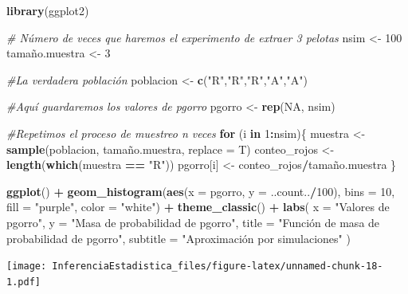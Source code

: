\documentclass[
]{book}
\newenvironment{Shaded}{\begin{snugshade}}{\end{snugshade}}
\newcommand{\CommentTok}[1]{\textcolor[rgb]{0.56,0.35,0.01}{\textit{#1}}}
\newcommand{\ControlFlowTok}[1]{\textcolor[rgb]{0.13,0.29,0.53}{\textbf{#1}}}
\newcommand{\DataTypeTok}[1]{\textcolor[rgb]{0.13,0.29,0.53}{#1}}
\newcommand{\DecValTok}[1]{\textcolor[rgb]{0.00,0.00,0.81}{#1}}
\newcommand{\KeywordTok}[1]{\textcolor[rgb]{0.13,0.29,0.53}{\textbf{#1}}}
\newcommand{\NormalTok}[1]{#1}
\newcommand{\OperatorTok}[1]{\textcolor[rgb]{0.81,0.36,0.00}{\textbf{#1}}}
\newcommand{\OtherTok}[1]{\textcolor[rgb]{0.56,0.35,0.01}{#1}}
\newcommand{\StringTok}[1]{\textcolor[rgb]{0.31,0.60,0.02}{#1}}
\begin{document}
\begin{Shaded}
\begin{Highlighting}[]
\KeywordTok{library}\NormalTok{(ggplot2)}

\CommentTok{# Número de veces que haremos el experimento de extraer 3 pelotas}
\NormalTok{nsim           <-}\StringTok{ }\DecValTok{100}
\NormalTok{tamaño.muestra <-}\StringTok{ }\DecValTok{3}

\CommentTok{#La verdadera población}
\NormalTok{poblacion <-}\StringTok{ }\KeywordTok{c}\NormalTok{(}\StringTok{"R"}\NormalTok{,}\StringTok{"R"}\NormalTok{,}\StringTok{"R"}\NormalTok{,}\StringTok{"A"}\NormalTok{,}\StringTok{"A"}\NormalTok{)}

\CommentTok{#Aquí guardaremos los valores de pgorro}
\NormalTok{pgorro    <-}\StringTok{ }\KeywordTok{rep}\NormalTok{(}\OtherTok{NA}\NormalTok{, nsim)}

\CommentTok{#Repetimos el proceso de muestreo n veces}
\ControlFlowTok{for}\NormalTok{ (i }\ControlFlowTok{in} \DecValTok{1}\OperatorTok{:}\NormalTok{nsim)\{}
\NormalTok{  muestra      <-}\StringTok{ }\KeywordTok{sample}\NormalTok{(poblacion, tamaño.muestra, }\DataTypeTok{replace =}\NormalTok{ T)}
\NormalTok{  conteo_rojos <-}\StringTok{ }\KeywordTok{length}\NormalTok{(}\KeywordTok{which}\NormalTok{(muestra }\OperatorTok{==}\StringTok{ "R"}\NormalTok{))}
\NormalTok{  pgorro[i]    <-}\StringTok{ }\NormalTok{conteo_rojos}\OperatorTok{/}\NormalTok{tamaño.muestra}
\NormalTok{\}}

\KeywordTok{ggplot}\NormalTok{() }\OperatorTok{+}
\StringTok{  }\KeywordTok{geom_histogram}\NormalTok{(}\KeywordTok{aes}\NormalTok{(}\DataTypeTok{x =}\NormalTok{ pgorro, }\DataTypeTok{y =}\NormalTok{ ..count..}\OperatorTok{/}\DecValTok{100}\NormalTok{), }
                 \DataTypeTok{bins =} \DecValTok{10}\NormalTok{, }\DataTypeTok{fill =} \StringTok{"purple"}\NormalTok{, }\DataTypeTok{color =} \StringTok{"white"}\NormalTok{) }\OperatorTok{+}
\StringTok{  }\KeywordTok{theme_classic}\NormalTok{() }\OperatorTok{+}
\StringTok{  }\KeywordTok{labs}\NormalTok{(}
    \DataTypeTok{x =} \StringTok{"Valores de pgorro"}\NormalTok{,}
    \DataTypeTok{y =} \StringTok{"Masa de probabilidad de pgorro"}\NormalTok{,}
    \DataTypeTok{title =} \StringTok{"Función de masa de probabilidad de pgorro"}\NormalTok{,}
    \DataTypeTok{subtitle =} \StringTok{"Aproximación por simulaciones"}
\NormalTok{  )}
\end{Highlighting}
\end{Shaded}

\texttt{[image: InferenciaEstadistica\_files/figure-latex/unnamed-chunk-18-1.pdf]}
\end{document}
